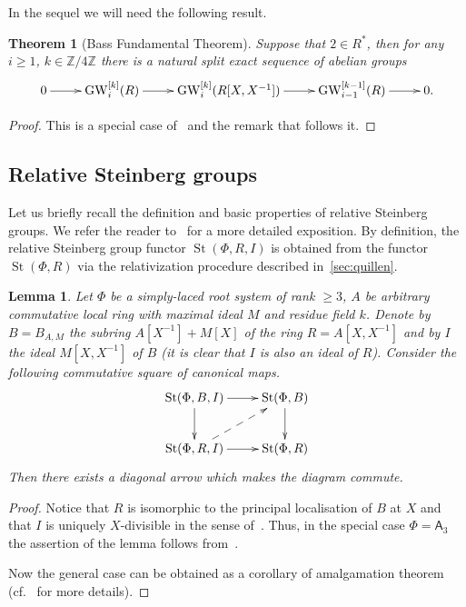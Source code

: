 \documentclass[oneside, 8pt]{amsart}
\newtheorem{theorem}{Theorem}
\newtheorem{lemma}{Lemma}
\theoremstyle{remark}
\theoremstyle{definition}
\DeclareMathOperator{\St}{St}
\DeclareMathOperator{\GW}{GW}
\newcommand{\ZZ}{\mathbb{Z}}
\newcommand{\rA}{\mathsf{A}}
\numberwithin{equation}{section}
\begin{document}
In the sequel we will need the following result.
\begin{theorem}[Bass Fundamental Theorem]\label{bass-ft} Suppose that $2 \in R^*$, then for any $i\geq 1$, $k\in \ZZ/4\ZZ$ there is a natural split exact sequence of abelian groups
 \[ \xymatrix{ 0 \ar[r] & \GW_i^{[k]}(R) \ar[r] & \GW_i^{[k]}(R[X, X^{-1}]) \ar[r]  & \GW_{i-1}^{[k-1]}(R) \ar[r] & 0.} \] \end{theorem}
\begin{proof} This is a special case of~\cite[Theorem~9.13]{Sch16} and the remark that follows it. \end{proof}

\subsection{Relative Steinberg groups}
Let us briefly recall the definition and basic properties of relative Steinberg groups.
We refer the reader to~\cite[Section~3]{S15} for a more detailed exposition.
By definition, the relative Steinberg group functor $\St(\Phi, R, I)$ is obtained from the functor $\St(\Phi, R)$
 via the relativization procedure described in~\cref{sec:quillen}.

\begin{lemma}\label{lem:lemma32} Let $\Phi$ be a simply-laced root system of rank $\geq 3$,
$A$ be arbitrary commutative local ring with maximal ideal $M$ and residue field $k$.
Denote by $B = B_{A, M}$ the subring $A[X^{-1}] + M[X]$ of the ring $R = A[X, X^{-1}]$ and
by $I$ the ideal $M[X, X^{-1}]$ of $B$ (it is clear that $I$ is also an ideal of $R$).
Consider the following commutative square of canonical maps.
\[ \xymatrix{
    \St(\Phi, B, I) \ar[r] \ar[d] & \St(\Phi, B) \ar[d] \\
    \St(\Phi, R, I) \ar[r] \ar@{-->}[ur] & \St(\Phi, R)
   } \]
Then there exists a diagonal arrow which makes the diagram commute.   
\end{lemma} 
\begin{proof}
 Notice that $R$ is isomorphic to the principal localisation of $B$ at $X$
  and that $I$ is uniquely $X$-divisible in the sense of~\cite[\S~4]{LS17}.
 Thus, in the special case $\Phi = \rA_3$ the assertion of the lemma follows from~\cite[Theorem~3]{LS17}.
 
 Now the general case can be obtained as a corollary of amalgamation theorem~\cite[Theorem~9]{S15}
  (cf.~\cite[\S~4]{LS17} for more details).
\end{proof}
\end{document}
